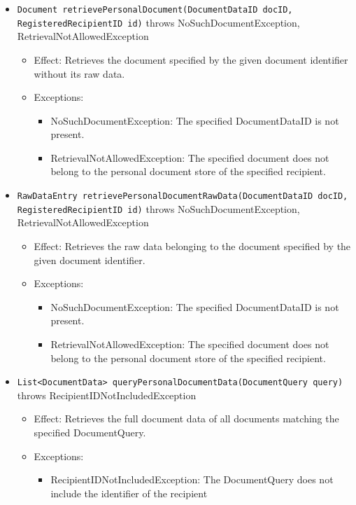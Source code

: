 \documentclass[a4paper,10pt]{article}
\begin{document}
\begin{itemize}
\begin{itemize}
		\item \texttt{Document retrievePersonalDocument(DocumentDataID docID, RegisteredRecipientID id)} throws NoSuchDocumentException, RetrievalNotAllowedException
		\begin{itemize}
			\item Effect: Retrieves the document specified by the given document identifier without its raw data.
			\item Exceptions:
			\begin{itemize}
				\item NoSuchDocumentException: The specified DocumentDataID is not present.
				\item RetrievalNotAllowedException: The specified document does not belong to the personal document store of the specified recipient.
			\end{itemize}
		\end{itemize}

		\item \texttt{RawDataEntry retrievePersonalDocumentRawData(DocumentDataID docID, RegisteredRecipientID id)} throws NoSuchDocumentException, RetrievalNotAllowedException
		\begin{itemize}
			\item Effect: Retrieves the raw data belonging to the document specified by the given document identifier.
			\item Exceptions:
			\begin{itemize}
				\item NoSuchDocumentException: The specified DocumentDataID is not present.
				\item RetrievalNotAllowedException: The specified document does not belong to the personal document store of the specified recipient.
			\end{itemize}
		\end{itemize}

		\item \texttt{List<DocumentData> queryPersonalDocumentData(DocumentQuery query)} throws RecipientIDNotIncludedException
		\begin{itemize}
			\item Effect: Retrieves the full document data of all documents matching the specified DocumentQuery.
			\item Exceptions:
			\begin{itemize}
				\item RecipientIDNotIncludedException: The DocumentQuery does not include the identifier of the recipient
			\end{itemize}
		\end{itemize}


\end{itemize}
\end{itemize}
\end{document}
